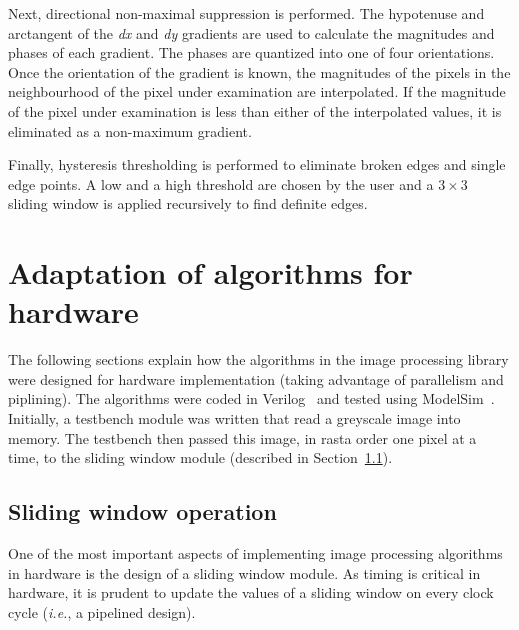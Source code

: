 \documentclass[10pt,twocolumn,letterpaper]{article}
\begin{document}
Next, directional non-maximal suppression is performed.
The hypotenuse and arctangent of the \emph{dx} and \emph{dy} gradients 
are used to calculate the magnitudes and phases of each gradient.
The phases are quantized into one of four orientations. 
Once the orientation of the gradient is known, the magnitudes of the pixels in
the neighbourhood of the pixel under examination are interpolated. If the magnitude of the pixel under examination is less
than either of the interpolated values, it is eliminated as a non-maximum gradient. 

Finally, hysteresis thresholding is performed to eliminate broken edges and single edge points.
A low and a high threshold are chosen by the user and 
a $3\times3$ sliding window is applied recursively to find definite edges.


\section{Adaptation of algorithms for hardware}
The following sections explain how the algorithms in the image processing library were designed for
hardware implementation (taking advantage of parallelism and piplining). The algorithms were
coded in Verilog~\cite{thomasVerilog} and tested using ModelSim~\cite{modelsim}.
Initially, a testbench module was written that read a greyscale image 
into memory. The testbench then passed this image, in rasta order one pixel at a time, 
to the sliding window module (described in Section~\ref{sec:slideWin}).

\subsection{Sliding window operation}
\label{sec:slideWin}
One of the most important aspects of implementing image processing algorithms in hardware is the
design of a sliding window module.
As timing is critical in hardware, it is prudent to 
update the values of a sliding window on every clock cycle (\emph{i.e.}, a pipelined design).
\end{document}
